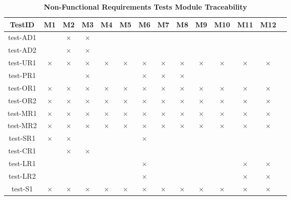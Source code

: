 \documentclass[12pt, titlepage]{article}
\begin{document}
\begin{table} [H]
  \centering
  \begin{tabular}{|c|c|c|c|c|c|c|c|c|c|c|c|c|c|}
    \hline
    TestID & M1 & M2 & M3 & M4 & M5 & M6 & M7 & M8 & M9 & M10 & M11 & M12 \\
    \hline
    test-AD1 & & $\times$ & $\times$ & & & & & & & & &\\
    \hline
    test-AD2 & & $\times$ & $\times$ & & & & & & & & &\\
    \hline
    test-UR1 & $\times$ & $\times$ & $\times$ & $\times$ & $\times$ & $\times$ & $\times$ & $\times$ & $\times$ & $\times$ & $\times$ & $\times$ \\
    \hline
    test-PR1 & & & $\times$ & & & $\times$ & $\times$ & $\times$ & & & &\\
    \hline
    test-OR1 & $\times$ & $\times$ & $\times$ & $\times$ & $\times$ & $\times$ & $\times$ & $\times$ & $\times$ & $\times$ & $\times$ & $\times$ \\
    \hline
    test-OR2 & $\times$ & $\times$ & $\times$ & $\times$ & $\times$ & $\times$ & $\times$ & $\times$ & $\times$ & $\times$ & $\times$ & $\times$ \\
    \hline
    test-MR1 & $\times$ & $\times$ & $\times$ & $\times$ & $\times$ & $\times$ & $\times$ & $\times$ & $\times$ & $\times$ & $\times$ & $\times$ \\
    \hline
    test-MR2 & $\times$ & $\times$ & $\times$ & $\times$ & $\times$ & $\times$ & $\times$ & $\times$ & $\times$ & $\times$ & $\times$ & $\times$ \\
    \hline
    test-SR1 & $\times$ & $\times$ & & & & $\times$ & & & & & & \\
    \hline
    test-CR1 & & $\times$ & $\times$ & & & & & & & & & \\
    \hline
    test-LR1 & & & & & & $\times$ & & & & & $\times$ & $\times$\\
    \hline
    test-LR2 & & & & & & $\times$ & & & & & $\times$ & $\times$\\
    \hline
    test-S1 & $\times$ & $\times$ & $\times$ & $\times$ & $\times$ & $\times$ & $\times$ & $\times$ & $\times$ & $\times$ & $\times$ & $\times$ \\
    \hline
  \end{tabular}
\caption{\bf Non-Functional Requirements Tests Module Traceability} \label{tab:nfr-test-traceability}
\end{table}
\end{document}
